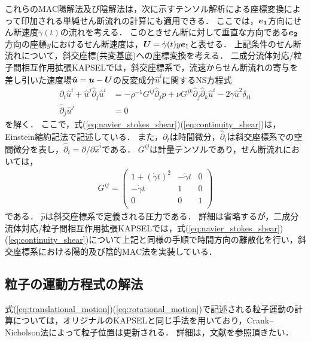 \documentclass[pdflatex,a4paper,10pt,ja=standard]{bxjsarticle}
\def\vec#1{\mbox{\boldmath $#1$}}
\begin{document}
これらのMAC陽解法及び陰解法は，次に示すテンソル解析による座標変換によって印加される単純せん断流れの計算\autocite{kobayashi2011implementation,molina2016rheological}にも適用できる．
ここでは，$\vec{e_{1}}$方向にせん断速度$\dot{\gamma}(t)$の流れを考える．
このときせん断に対して垂直な方向である$\vec{e_{2}}$方向の座標$y$におけるせん断速度は，$\vec{U} = \dot{\gamma}(t) y \vec{e}_{1}$と表せる．
上記条件のせん断流れについて，斜交座標(共変基底)への座標変換を考える．
二成分流体対応/粒子間相互作用拡張KAPSELでは，斜交座標系で，流速からせん断流れの寄与を差し引いた速度場$\vec{\hat{u}} = \vec{u} - \vec{U}$の反変成分$\hat{u}^{i}$に関するNS方程式
\begin{align}
    \partial_{t} \hat{u}^{i} + \hat{u}^{j} \hat{\partial}_{j} \hat{u}^{i}
    &= - \rho^{-1} G^{ij} \hat{\partial}_{j} \hat{p} + \nu G^{jk} \hat{\partial}_{j} \hat{\partial}_{k} \hat{u}^{i} - 2 \dot{\gamma} \hat{u}^{2} \delta_{i1}
    \label{eq:navier_stokes_shear}\\
    \hat{\partial}_{j}\hat{u}^{j} &= 0
    \label{eq:continuity_shear}
\end{align}
を解く．
ここで，式(\ref{eq:navier_stokes_shear})(\ref{eq:continuity_shear})は，Einstein縮約記法で記述している．
また，$\partial_{t}$は時間微分，$\hat{\partial}_{i}$は斜交座標系での空間微分を表し，$\hat{\partial}_{i} = \partial / \partial \hat{x}^{i}$である．
$G^{ij}$は計量テンソルであり，せん断流れにおいては，
\begin{align}
    G^{ij} = \begin{pmatrix}
        1 + (\dot{\gamma} t)^{2} & - \dot{\gamma} t & 0\\
        - \dot{\gamma} t & 1 & 0 \\
        0 & 0 & 1 \\
        \end{pmatrix}
    \label{eq:metric_tensor}
\end{align}
である\autocite{molina2016rheological}．
$\hat{p}$は斜交座標系で定義される圧力である．
詳細は省略するが，二成分流体対応/粒子間相互作用拡張KAPSELでは，式(\ref{eq:navier_stokes_shear})(\ref{eq:continuity_shear})について上記と同様の手順で時間方向の離散化を行い，斜交座標系における陽的及び陰的MAC法を実装している．

\subsection{粒子の運動方程式の解法}
式(\ref{eq:translational_motion})(\ref{eq:rotational_motion})で記述される粒子運動の計算については，オリジナルのKAPSELと同じ手法を用いており，Crank--Nicholson法によって粒子位置は更新される．
詳細は，文献\autocite{nakayama2005simulation}を参照頂きたい．
\end{document}
